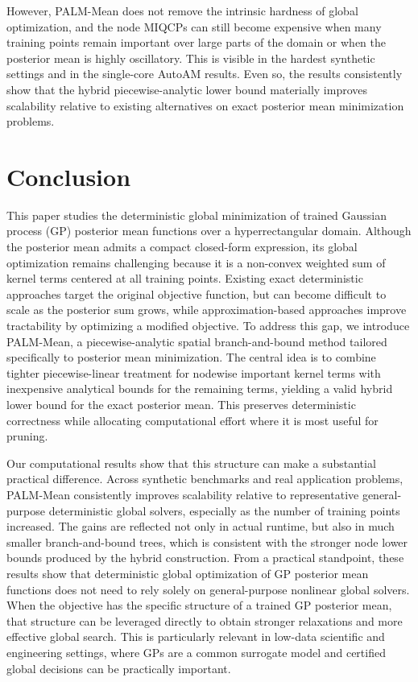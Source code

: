\documentclass[pdflatex,sn-mathphys-num]{sn-jnl}%
\theoremstyle{thmstyleone}%
\theoremstyle{thmstyletwo}%
\theoremstyle{thmstylethree}%
\begin{document}
However, PALM-Mean does not remove the intrinsic hardness of global optimization, and the node MIQCPs can still become expensive when many training points remain important over large parts of the domain or when the posterior mean is highly oscillatory. This is visible in the hardest synthetic settings and in the single-core AutoAM results. Even so, the results consistently show that the hybrid piecewise-analytic lower bound materially improves scalability relative to existing alternatives on exact posterior mean minimization problems.

\section{Conclusion}
\label{sec:conclusions}

This paper studies the deterministic global minimization of trained Gaussian process (GP) posterior mean functions over a hyperrectangular domain. Although the posterior mean admits a compact closed-form expression, its global optimization remains challenging because it is a non-convex weighted sum of kernel terms centered at all training points. Existing exact deterministic approaches target the original objective function, but can become difficult to scale as the posterior sum grows, while approximation-based approaches improve tractability by optimizing a modified objective.
To address this gap, we introduce PALM-Mean, a piecewise-analytic spatial branch-and-bound method tailored specifically to posterior mean minimization. The central idea is to combine tighter piecewise-linear treatment for nodewise important kernel terms with inexpensive analytical bounds for the remaining terms, yielding a valid hybrid lower bound for the exact posterior mean. This preserves deterministic correctness while allocating computational effort where it is most useful for pruning.

Our computational results show that this structure can make a substantial practical difference. Across synthetic benchmarks and real application problems, PALM-Mean consistently improves scalability relative to representative general-purpose deterministic global solvers, especially as the number of training points increased. The gains are reflected not only in actual runtime, but also in much smaller branch-and-bound trees, which is consistent with the stronger node lower bounds produced by the hybrid construction.
From a practical standpoint, these results show that deterministic global optimization of GP posterior mean functions does not need to rely solely on general-purpose nonlinear global solvers. When the objective has the specific structure of a trained GP posterior mean, that structure can be leveraged directly to obtain stronger relaxations and more effective global search. This is particularly relevant in low-data scientific and engineering settings, where GPs are a common surrogate model and certified global decisions can be practically important. 
\end{document}
